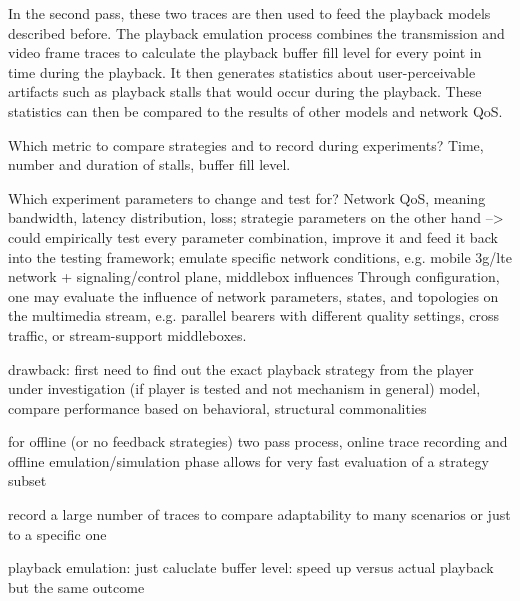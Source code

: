 

In the second pass, these two traces are then used to feed the playback models described before. The playback emulation process combines the transmission and video frame traces to calculate the playback buffer fill level for every point in time during the playback. It then generates statistics about user-perceivable artifacts such as playback stalls that would occur during the playback. These statistics can then be compared to the results of other models and network QoS.




Which metric to compare strategies and to record during experiments? Time, number and duration of stalls, buffer fill level.

Which experiment parameters to change and test for? Network \gls{QoS}, meaning bandwidth, latency distribution, loss; strategie parameters on the other hand --> could empirically test every parameter combination, improve it and feed it back into the testing framework; emulate specific network conditions, e.g. mobile 3g/lte network + signaling/control plane, middlebox influences
 Through configuration, one may evaluate the influence of network parameters, states, and topologies on the multimedia stream, e.g. parallel bearers with different quality settings, cross traffic, or stream-support middleboxes.


drawback: first need to find out the exact playback strategy from the player under investigation (if player is tested and not mechanism in general)
model, compare performance based on behavioral, structural commonalities

for offline (or no feedback strategies) two pass process, online trace recording and offline emulation/simulation phase
allows for very fast evaluation of a strategy subset

record a large number of traces to compare adaptability to many scenarios or just to a specific one

playback emulation: just caluclate buffer level: speed up versus actual playback but the same outcome



